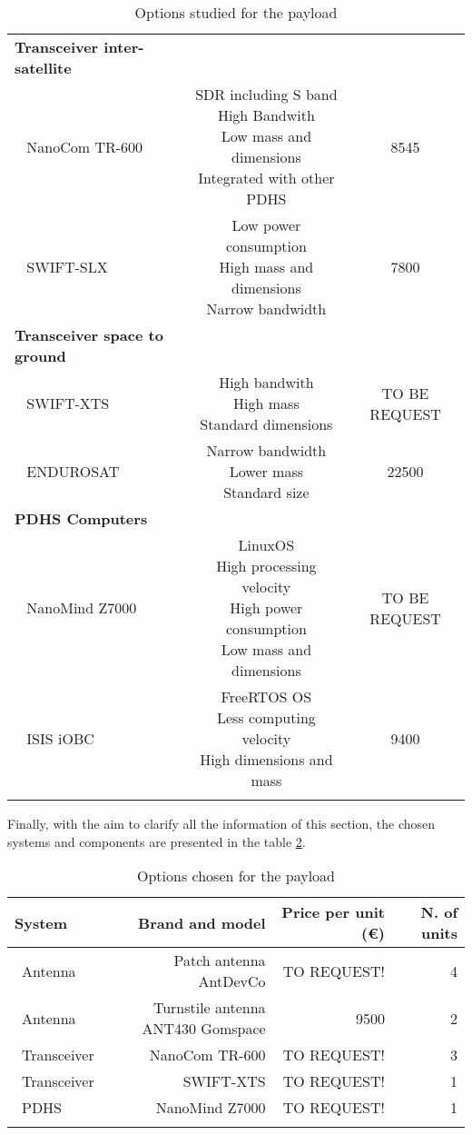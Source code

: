 \begin{longtable}{| l | c | c | }
\rowcolor[gray]{0.85} \textbf{Transceiver inter-satellite} &  &  \\
	   ~	NanoCom TR-600 & \makecell{SDR including S band\\ High Bandwith \\ Low mass and dimensions\\Integrated with other PDHS} & 8545 \\
	   \hline
	   ~	SWIFT-SLX & \makecell{Low power consumption\\ High mass and dimensions\\ Narrow bandwidth} & 7800 \\
	   \hline
	\hline
\rowcolor[gray]{0.85} \textbf{Transceiver space to ground} &  &  \\
~	SWIFT-XTS & \makecell{High bandwith\\ High mass \\ Standard dimensions} & TO BE REQUEST \\
	   \hline
~	ENDUROSAT & \makecell{Narrow bandwidth\\ Lower mass\\ Standard size} & 22500 \\
\hline
\hline
\rowcolor[gray]{0.85} \textbf{PDHS Computers} &  &  \\
~	NanoMind Z7000 & \makecell{LinuxOS\\ High processing velocity\\ High power consumption\\ Low mass and dimensions} & TO BE REQUEST \\
\hline
~	ISIS iOBC& \makecell{FreeRTOS OS\\ Less computing velocity \\ High dimensions and mass} & 9400 \\
\hline
\hline
	
\caption{Options studied for the payload}
\label{payloadoptions}
\end{longtable}

Finally, with the aim to clarify all the information of this section, the chosen systems and components are presented in the table \ref{payloadchosen}.

\begin{longtable}{| l | r | r | r |}
	\hline
	\rowcolor[gray]{0.80}	\textbf{System} &  \textbf{Brand and model}     & \textbf{Price per unit (\euro)} & \textbf{N. of units}  \\
	\hline
	\endfirsthead
	
	~Antenna & Patch antenna AntDevCo & TO REQUEST! & 4 \\
	~Antenna & Turnstile antenna ANT430 Gomspace & 9500 & 2 \\
	~Transceiver & NanoCom TR-600 & TO REQUEST! & 3 \\
	~Transceiver& SWIFT-XTS &TO REQUEST!&1\\
	~PDHS & NanoMind Z7000 & TO REQUEST! & 1 \\
	\hline
	
\caption{Options chosen for the payload}
\label{payloadchosen}
\end{longtable}


